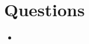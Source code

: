 \documentclass[aps,pra,showpacs,notitlepage,onecolumn,superscriptaddress,nofootinbib]{revtex4-1}
\theoremstyle{definition}
\begin{document}
\section{Questions}

\begin{itemize}
    \item
\end{itemize}
\end{document}
